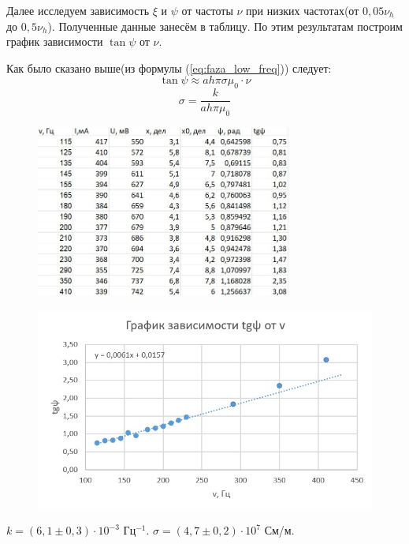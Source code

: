 \documentclass[a4paper,12pt]{article}
\begin{document}
Далее исследуем зависимость $\xi$ и $\psi$ от частоты $\nu$ при низких частотах(от $0,05 \nu_h$ до $0,5 \nu_h$). Полученные данные занесём в таблицу. По этим результатам построим график зависимости $\tan \psi$ от $\nu$.

Как было сказано выше(из формулы (\ref{eq:faza_low_freq})) следует:
\[\tan\psi \approx ah\pi\sigma\mu_0 \cdot \nu\]
\[\sigma = \frac{k}{ah\pi\mu_0}\]

\begin{figure}[H]
	\begin{center}	\includegraphics[width=0.75\textwidth]{tabliza2.jpg}
	\end{center}
\end{figure}

\begin{figure}[H]
	\begin{center}	\includegraphics[width=1\textwidth]{graphik2.jpg}
	\end{center}
\end{figure}

$k = (6,1 \pm 0,3) \cdot 10^{-3}$ Гц$^{-1}$. $\sigma = (4,7 \pm 0,2) \cdot 10^7$ См/м.
\end{document}
